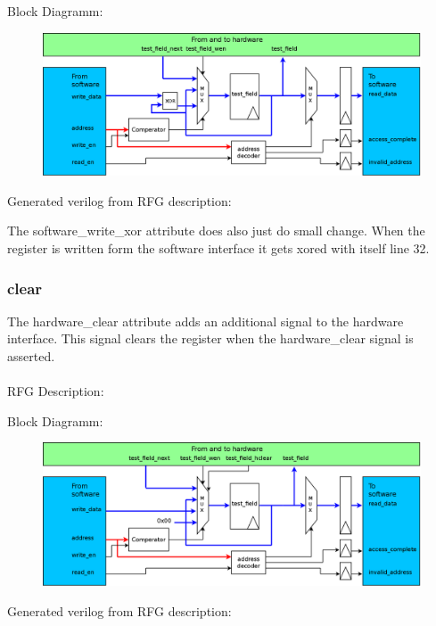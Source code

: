 \documentclass[12pt,a4paper]{article}
\begin{document}
Block Diagramm:
\begin{figure}[h!]
    \includegraphics[width=\textwidth]{pictures/Reg_hrw_srw_swrite_xor.png}
\end{figure}
\newpage
Generated verilog from RFG description:

The software\_write\_xor attribute does also just do small change. When the register is written form the software interface it gets xored with itself line 32.
\newpage

\subsubsection{clear}
The hardware\_clear attribute adds an additional signal to the hardware interface. This signal clears the register when the hardware\_clear signal is asserted.\\
\\
RFG Description:


Block Diagramm:
\begin{figure}[h!]
    \includegraphics[width=\textwidth]{pictures/Reg_hrw_srw_hclear.png}
\end{figure}
\newpage
Generated verilog from RFG description:

\newpage
\end{document}
